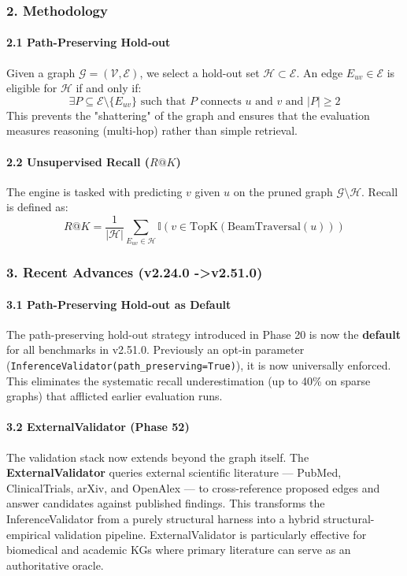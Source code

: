 \subsubsection{2. Methodology}

\paragraph{2.1 Path-Preserving Hold-out}
Given a graph $\mathcal{G} = (\mathcal{V}, \mathcal{E})$, we select a hold-out set $\mathcal{H} \subset \mathcal{E}$. An edge $E_{uv} \in \mathcal{E}$ is eligible for $\mathcal{H}$ if and only if:
\begin{equation}
\exists P \subseteq \mathcal{E} \setminus \{E_{uv}\} \text{ such that } P \text{ connects } u \text{ and } v \text{ and } |P| \geq 2
\end{equation}
This prevents the "shattering" of the graph and ensures that the evaluation measures reasoning (multi-hop) rather than simple retrieval.

\paragraph{2.2 Unsupe\-rvised Recall ($R@K$)}
The engine is tasked with predicting $v$ given $u$ on the pruned graph $\mathcal{G} \setminus \mathcal{H}$. Recall is defined as:
\begin{equation}
R@K = \frac{1}{|\mathcal{H}|} \sum_{E_{uv} \in \mathcal{H}} \mathbb{I}(v \in \text{TopK}(\text{BeamTraversal}(u)))
\end{equation}

\subsubsection{3. Recent Advances (v2.24.0 -\textgreater  v2.51.0)}

\paragraph{3.1 Path-Preserving Hold-out as Default}
The path-preserving hold-out strategy introduced in Phase 20 is now the \textbf{default} for all benchmarks in v2.51.0. Previously an opt-in parameter (\texttt{InferenceValidator(path\_preserving=True)}), it is now universally enforced. This eliminates the systematic recall under\-estimation (up to 40\% on sparse graphs) that afflicted earlier evaluation runs.

\paragraph{3.2 ExternalValidator (Phase 52)}
The validation stack now extends beyond the graph itself. The \textbf{ExternalValidator} queries external scientific literature — PubMed, ClinicalTrials, arXiv, and OpenAlex — to cross-reference proposed edges and answer candidates against published findings. This transforms the InferenceValidator from a purely structural harness into a hybrid structural-empirical validation pipeline. ExternalValidator is parti\-cularly effective for biomedical and academic KGs where primary literature can serve as an autho\-ritative oracle.

